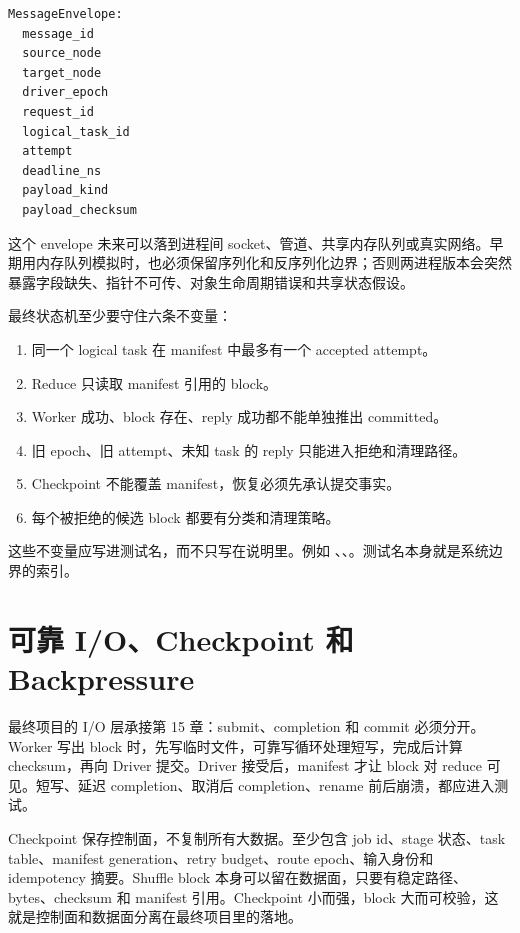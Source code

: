 \begin{lstlisting}[numbers=none,caption={MessageEnvelope 的语义字段}]
MessageEnvelope:
  message_id
  source_node
  target_node
  driver_epoch
  request_id
  logical_task_id
  attempt
  deadline_ns
  payload_kind
  payload_checksum
\end{lstlisting}

这个 envelope 未来可以落到进程间 socket、管道、共享内存队列或真实网络。早期用内存队列模拟时，也必须保留序列化和反序列化边界；否则两进程版本会突然暴露字段缺失、指针不可传、对象生命周期错误和共享状态假设。

最终状态机至少要守住六条不变量：

\begin{enumerate}
  \item 同一个 logical task 在 manifest 中最多有一个 accepted attempt。
  \item Reduce 只读取 manifest 引用的 block。
  \item Worker 成功、block 存在、reply 成功都不能单独推出 committed。
  \item 旧 epoch、旧 attempt、未知 task 的 reply 只能进入拒绝和清理路径。
  \item Checkpoint 不能覆盖 manifest，恢复必须先承认提交事实。
  \item 每个被拒绝的候选 block 都要有分类和清理策略。
\end{enumerate}

这些不变量应写进测试名，而不只写在说明里。例如 、、。测试名本身就是系统边界的索引。

\section{可靠 I/O、Checkpoint 和 Backpressure}

最终项目的 I/O 层承接第 15 章：submit、completion 和 commit 必须分开。Worker 写出 block 时，先写临时文件，可靠写循环处理短写，完成后计算 checksum，再向 Driver 提交。Driver 接受后，manifest 才让 block 对 reduce 可见。短写、延迟 completion、取消后 completion、rename 前后崩溃，都应进入测试。

Checkpoint 保存控制面，不复制所有大数据。至少包含 job id、stage 状态、task table、manifest generation、retry budget、route epoch、输入身份和 idempotency 摘要。Shuffle block 本身可以留在数据面，只要有稳定路径、bytes、checksum 和 manifest 引用。Checkpoint 小而强，block 大而可校验，这就是控制面和数据面分离在最终项目里的落地。

